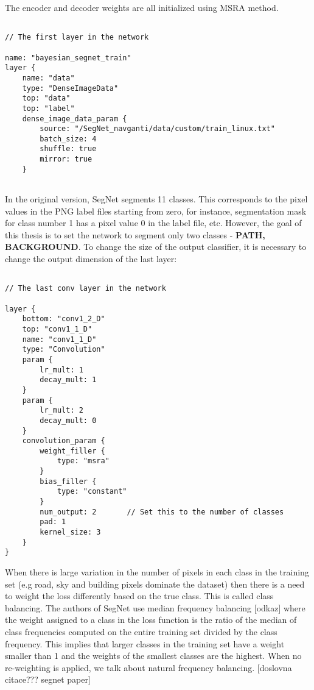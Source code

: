 The encoder and decoder weights are all initialized using MSRA method.  

\begin{lstlisting}

// The first layer in the network

name: "bayesian_segnet_train"
layer {
	name: "data"
	type: "DenseImageData"
	top: "data"
	top: "label"
	dense_image_data_param {
		source: "/SegNet_navganti/data/custom/train_linux.txt"
		batch_size: 4   			    			
		shuffle: true
		mirror: true	
	}
	
\end{lstlisting}	 

In the original version, SegNet segments 11 classes. This corresponds to the pixel values in the PNG label files starting from zero, for instance, segmentation mask for class number 1 has a pixel value 0 in the label file, etc. However, the goal of this thesis is to set the network to segment only two classes - \textbf{PATH, BACKGROUND}. To change the size of the output classifier, it is necessary to change the output dimension of the last layer:

\begin{lstlisting}

// The last conv layer in the network

layer {
	bottom: "conv1_2_D"
	top: "conv1_1_D"
	name: "conv1_1_D"
	type: "Convolution"
	param {
		lr_mult: 1
		decay_mult: 1
	}
	param {
		lr_mult: 2
		decay_mult: 0
	}
	convolution_param {
		weight_filler {
			type: "msra"
		}
		bias_filler {
			type: "constant"
		}
		num_output: 2		// Set this to the number of classes
		pad: 1
		kernel_size: 3
	}
}

\end{lstlisting}

When there is large variation in the number of
pixels in each class in the training set (e.g road, sky and building
pixels dominate the dataset) then there is a need to weight
the loss differently based on the true class. This is called class
balancing. The authors of SegNet use median frequency balancing [odkaz] where the weight assigned to a class in the loss function is the ratio of the
median of class frequencies computed on the entire training set
divided by the class frequency. This implies that larger classes in
the training set have a weight smaller than 1 and the weights
of the smallest classes are the highest. When no re-weighting is applied, we talk about natural frequency balancing. [doslovna citace??? segnet paper]

